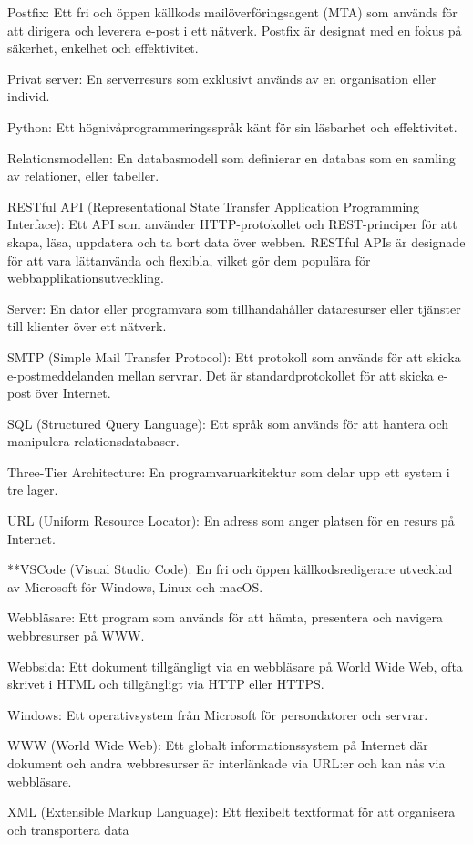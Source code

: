 Postfix: Ett fri och öppen källkods mailöverföringsagent (MTA) som används för att dirigera och leverera e-post i ett nätverk. Postfix är designat med en fokus på säkerhet, enkelhet och effektivitet.

Privat server: En serverresurs som exklusivt används av en organisation eller individ.

Python: Ett högnivåprogrammeringsspråk känt för sin läsbarhet och effektivitet.

Relationsmodellen: En databasmodell som definierar en databas som en samling av relationer, eller tabeller.

RESTful API (Representational State Transfer Application Programming Interface): Ett API som använder HTTP-protokollet och REST-principer för att skapa, läsa, uppdatera och ta bort data över webben. RESTful APIs är designade för att vara lättanvända och flexibla, vilket gör dem populära för webbapplikationsutveckling.

Server: En dator eller programvara som tillhandahåller dataresurser eller tjänster till klienter över ett nätverk.

SMTP (Simple Mail Transfer Protocol): Ett protokoll som används för att skicka e-postmeddelanden mellan servrar. Det är standardprotokollet för att skicka e-post över Internet.

SQL (Structured Query Language): Ett språk som används för att hantera och manipulera relationsdatabaser.

Three-Tier Architecture: En programvaruarkitektur som delar upp ett system i tre lager.

URL (Uniform Resource Locator): En adress som anger platsen för en resurs på Internet.

**VSCode (Visual Studio Code): En fri och öppen källkodsredigerare utvecklad av Microsoft för Windows, Linux och macOS.

Webbläsare: Ett program som används för att hämta, presentera och navigera webbresurser på WWW.

Webbsida: Ett dokument tillgängligt via en webbläsare på World Wide Web, ofta skrivet i HTML och tillgängligt via HTTP eller HTTPS.

Windows: Ett operativsystem från Microsoft för persondatorer och servrar.

WWW (World Wide Web): Ett globalt informationssystem på Internet där dokument och andra webbresurser är interlänkade via URL:er och kan nås via webbläsare.

XML (Extensible Markup Language): Ett flexibelt textformat för att organisera och transportera data

